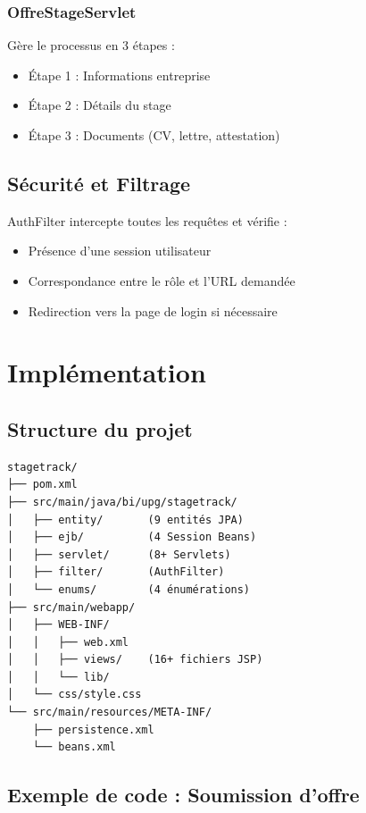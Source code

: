\documentclass[12pt,a4paper]{report}
\begin{document}
\subsection{OffreStageServlet}
Gère le processus en 3 étapes :
\begin{itemize}
    \item Étape 1 : Informations entreprise
    \item Étape 2 : Détails du stage
    \item Étape 3 : Documents (CV, lettre, attestation)
\end{itemize}

\section{Sécurité et Filtrage}
AuthFilter intercepte toutes les requêtes et vérifie :
\begin{itemize}
    \item Présence d'une session utilisateur
    \item Correspondance entre le rôle et l'URL demandée
    \item Redirection vers la page de login si nécessaire
\end{itemize}

\chapter{Implémentation}

\section{Structure du projet}
\begin{verbatim}
stagetrack/
├── pom.xml
├── src/main/java/bi/upg/stagetrack/
│   ├── entity/       (9 entités JPA)
│   ├── ejb/          (4 Session Beans)
│   ├── servlet/      (8+ Servlets)
│   ├── filter/       (AuthFilter)
│   └── enums/        (4 énumérations)
├── src/main/webapp/
│   ├── WEB-INF/
│   │   ├── web.xml
│   │   ├── views/    (16+ fichiers JSP)
│   │   └── lib/
│   └── css/style.css
└── src/main/resources/META-INF/
    ├── persistence.xml
    └── beans.xml
\end{verbatim}

\section{Exemple de code : Soumission d'offre}
\end{document}
